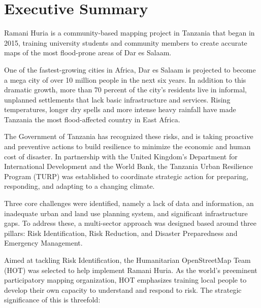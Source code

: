 \documentclass[a4paper,12pt,twoside]{article}
\begin{document}
\section{Executive Summary}
\label{executivesummary}
\begin{multicols}{2}

Ramani Huria is a community-based mapping project in Tanzania that began in 2015, training university students and community members to create accurate maps of the most flood-prone areas of Dar es Salaam. 

One of the fastest-growing cities in Africa, Dar es Salaam is projected to become a mega city of over 10 million people in the next six years. In addition to this dramatic growth, more than 70 percent of the city's residents live in informal, unplanned settlements that lack basic infrastructure and services. Rising temperatures, longer dry spells and more intense heavy rainfall have made Tanzania the most flood-affected country in East Africa.

The Government of Tanzania has recognized these risks, and is taking proactive and preventive actions to build resilience to minimize the economic and human cost of disaster. In partnership with the United Kingdom's Department for International Development and the World Bank, the Tanzania Urban Resilience Program (TURP) was established to coordinate strategic action for preparing, responding, and adapting to a changing climate.

Three core challenges were identified, namely a lack of data and information, an inadequate urban and land use planning system, and significant infrastructure gaps. To address these, a multi-sector approach was designed based around three pillars: Risk Identification, Risk Reduction, and Disaster Preparedness and Emergency Management. 

Aimed at tackling Risk Identification, the Humanitarian OpenStreetMap Team (HOT) was selected  to help implement  Ramani Huria. As the world's preeminent participatory mapping organization, HOT emphasizes training local people  to develop their own capacity to understand and respond to risk. The strategic significance of this is threefold: 




\end{multicols}
\end{document}
